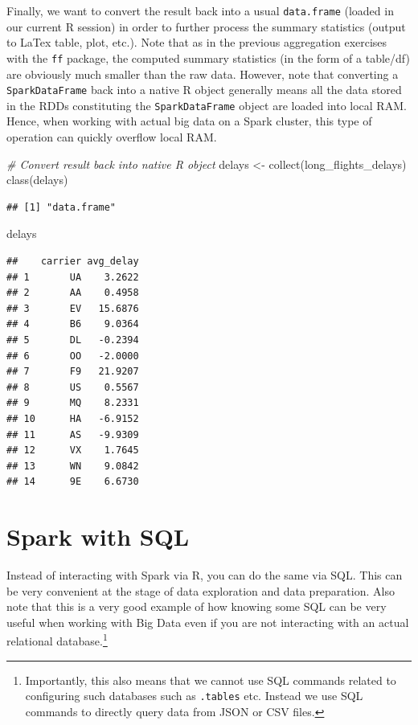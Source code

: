 \documentclass[
  12pt,
]{style/krantz}
\newenvironment{Shaded}{\begin{snugshade}}{\end{snugshade}}
\newcommand{\CommentTok}[1]{\textcolor[rgb]{0.56,0.35,0.01}{\textit{#1}}}
\newcommand{\FunctionTok}[1]{\textcolor[rgb]{0.00,0.00,0.00}{#1}}
\newcommand{\NormalTok}[1]{#1}
\newcommand{\OtherTok}[1]{\textcolor[rgb]{0.56,0.35,0.01}{#1}}
\begin{document}
Finally, we want to convert the result back into a usual \texttt{data.frame} (loaded in our current R session) in order to further process the summary statistics (output to LaTex table, plot, etc.). Note that as in the previous aggregation exercises with the \texttt{ff} package, the computed summary statistics (in the form of a table/df) are obviously much smaller than the raw data. However, note that converting a \texttt{SparkDataFrame} back into a native R object generally means all the data stored in the RDDs constituting the \texttt{SparkDataFrame} object are loaded into local RAM. Hence, when working with actual big data on a Spark cluster, this type of operation can quickly overflow local RAM.

\begin{Shaded}
\begin{Highlighting}[]
\CommentTok{\# Convert result back into native R object}
\NormalTok{delays }\OtherTok{\textless{}{-}} \FunctionTok{collect}\NormalTok{(long\_flights\_delays)}
\FunctionTok{class}\NormalTok{(delays)}
\end{Highlighting}
\end{Shaded}

\begin{verbatim}
## [1] "data.frame"
\end{verbatim}

\begin{Shaded}
\begin{Highlighting}[]
\NormalTok{delays}
\end{Highlighting}
\end{Shaded}

\begin{verbatim}
##    carrier avg_delay
## 1       UA    3.2622
## 2       AA    0.4958
## 3       EV   15.6876
## 4       B6    9.0364
## 5       DL   -0.2394
## 6       OO   -2.0000
## 7       F9   21.9207
## 8       US    0.5567
## 9       MQ    8.2331
## 10      HA   -6.9152
## 11      AS   -9.9309
## 12      VX    1.7645
## 13      WN    9.0842
## 14      9E    6.6730
\end{verbatim}

\hypertarget{spark-with-sql}{%
\section{Spark with SQL}\label{spark-with-sql}}

Instead of interacting with Spark via R, you can do the same via SQL. This can be very convenient at the stage of data exploration and data preparation. Also note that this is a very good example of how knowing some SQL can be very useful when working with Big Data even if you are not interacting with an actual relational database.\footnote{Importantly, this also means that we cannot use SQL commands related to configuring such databases such as \texttt{.tables} etc. Instead we use SQL commands to directly query data from JSON or CSV files.}
\end{document}

